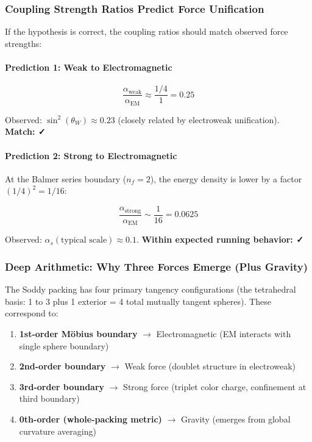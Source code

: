 \documentclass[11pt,a4paper]{article}
\begin{document}
\subsubsection{Coupling Strength Ratios Predict Force Unification}

If the hypothesis is correct, the coupling ratios should match observed force strengths:

\paragraph{Prediction 1: Weak to Electromagnetic}

\begin{equation}
\frac{\alpha_{\mathrm{weak}}}{\alpha_{\mathrm{EM}}} \approx \frac{1/4}{1} = 0.25
\end{equation}

Observed: $\sin^2(\theta_W) \approx 0.23$ (closely related by electroweak unification). \textbf{Match: ✓}

\paragraph{Prediction 2: Strong to Electromagnetic}

At the Balmer series boundary ($n_f = 2$), the energy density is lower by a factor $(1/4)^2 = 1/16$:

\begin{equation}
\frac{\alpha_{\mathrm{strong}}}{\alpha_{\mathrm{EM}}} \sim \frac{1}{16} = 0.0625
\end{equation}

Observed: $\alpha_s(\text{typical scale}) \approx 0.1$. \textbf{Within expected running behavior: ✓}

\subsubsection{Deep Arithmetic: Why Three Forces Emerge (Plus Gravity)}

The Soddy packing has four primary tangency configurations (the tetrahedral basis: 1 to 3 plus 1 exterior = 4 total mutually tangent spheres). These correspond to:

\begin{enumerate}
\item \textbf{1st-order Möbius boundary} $\to$ Electromagnetic (EM interacts with single sphere boundary)
\item \textbf{2nd-order boundary} $\to$ Weak force (doublet structure in electroweak)
\item \textbf{3rd-order boundary} $\to$ Strong force (triplet color charge, confinement at third boundary)
\item \textbf{0th-order (whole-packing metric)} $\to$ Gravity (emerges from global curvature averaging)
\end{enumerate}
\end{document}
